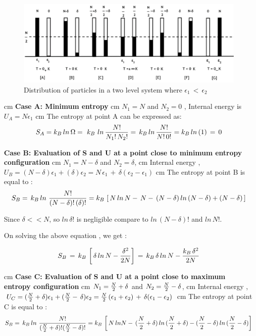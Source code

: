 \documentclass{article}
\begin{document}
\begin{figure}[ht!]
\centering
\includegraphics[scale=0.4]{2A.png}
\caption{Distribution of particles in a two level system where $\epsilon_1 \, < \, \epsilon_2$}
\end{figure}
 cm
{\bf Case A: Minimum entropy}
 cm
$ N_1  = N $ and $N_2 = 0$ , Internal energy  is $ U_A = N\epsilon_1$
 cm
The entropy at point A can be expressed as:
$$ S_A = k_B \, ln \, \Omega  = \,\,k_B\,\, ln \,{ N! \over {N_1! \, N_2!}} =\,k_B\, ln \,{ N! \over {N! \, 0!}}= k_B\, ln \,(1)\, = \, 0$$  
\vskip 0.5cm

{\bf Case B: Evaluation of S and U at a point close to minimum entropy configuration}
 cm
 $N_1 = {N} - \delta $ and $N_2 = \delta $, 
  cm
 Internal energy , $U_B = ({N} - \delta)\epsilon_1 + (\delta)\epsilon_2 = {N} \, \epsilon_1  \, + \,  \delta ( \epsilon_2 - \epsilon_1)$
  cm
 The entropy at point B is equal to : 
 $$ S_B= \, k_B \, ln \,\,{ N! \over { ( {N} - \delta )!\, (\delta )!}} = k_B\,\left[ \, N\, ln \,N - \, N - \,( {N} - \delta )\, ln\, ( {N } -  \delta ) + ( {N } - \delta )\, \right]$$
 
 Since $\delta < < N$, so $ln \, \delta !$ is negligible compare to $ln \,(N - \delta) !$ and $ln \, N !$.

On solving the above equation , we get :

$$ S_B \, = \, k_B\, \left[ \, \delta\, ln \, N - { \delta^2 \over {2 N}}\right]\, = \,  k_B\, \delta\, ln \, N - { k_B\,\delta^2 \over {2 N}}$$

 cm
{\bf Case C: Evaluation of S and U  at a point close to maximum entropy configuration}
 cm
 $N_1 = {N \over2} + \delta $ and $N_2 = {N \over2} - \delta $, 
  cm
 Internal energy , $U_C = ({N \over2} + \delta)\epsilon_1 + ({N \over 2} -\, \delta)\epsilon_2 = {N\over 2} \,( \epsilon_1 + \epsilon_2) \, + \,  \delta ( \epsilon_1 - \epsilon_2)$
  cm
 The entropy at point C is equal to : 
 $$ S_B= \, k_B \, ln \,\,{ N! \over { ( {N \over 2} +  \delta )! ( {N \over 2} -  \delta )!}} = k_B\,\left[ \, N\, ln N - \,( {N \over 2} +  \delta )\, ln\, ( {N \over 2} +  \delta ) - ( {N \over 2} - \delta )\, ln \,( {N \over 2} -  \delta )\right]$$
 
\end{document}
